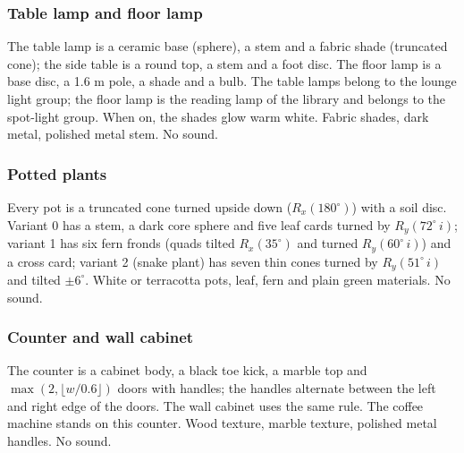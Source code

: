 \subsubsection{Table lamp and floor lamp}
 The table lamp is a ceramic base (sphere), a stem and a fabric shade (truncated cone);
the side table is a round top, a stem and a foot disc. The floor lamp is a base disc, a 1.6 m pole, a shade
and a bulb.
 The table lamps belong to the lounge light group; the floor lamp is the reading lamp of the
library and belongs to the spot-light group. When on, the shades glow warm white.
 Fabric shades, dark metal, polished metal stem. No sound.

\subsubsection{Potted plants}
 Every pot is a truncated cone turned upside down ($R_x(180^\circ)$) with a soil disc.
Variant 0 has a stem, a dark core sphere and five leaf cards turned by $R_y(72^\circ\,i)$; variant 1 has six fern
fronds (quads tilted $R_x(35^\circ)$ and turned $R_y(60^\circ\,i)$) and a cross card; variant 2 (snake plant)
has seven thin cones turned by $R_y(51^\circ\,i)$ and tilted $\pm6^\circ$.
 White or terracotta pots, leaf, fern and plain green materials. No sound.

\subsubsection{Counter and wall cabinet}
 The counter is a cabinet body, a black toe kick, a marble top and $\max(2,\lfloor w/0.6\rfloor)$
doors with handles; the handles alternate between the left and right edge of the doors. The wall cabinet
uses the same rule. The coffee machine stands on this counter.
 Wood texture, marble texture, polished metal handles. No sound.

